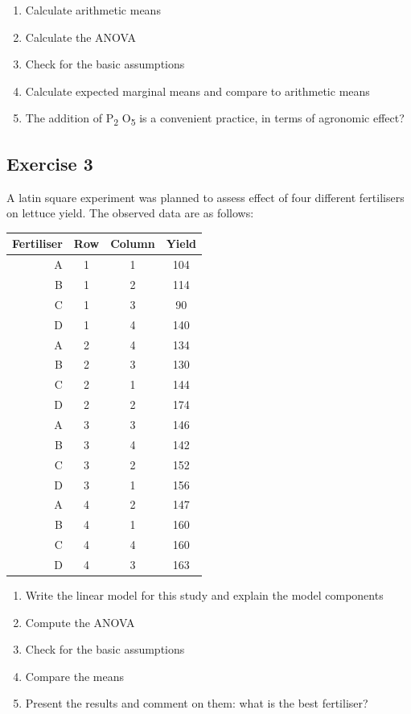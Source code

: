 \documentclass[a4paper,12pt,oneside]{book}
\providecommand{\tightlist}{%
  \setlength{\itemsep}{0pt}\setlength{\parskip}{0pt}}
\begin{document}
\begin{enumerate}
\def\labelenumi{\arabic{enumi}.}
\tightlist
\item
  Calculate arithmetic means
\item
  Calculate the ANOVA
\item
  Check for the basic assumptions
\item
  Calculate expected marginal means and compare to arithmetic means
\item
  The addition of P\textsubscript{2} O\textsubscript{5} is a convenient practice, in terms of agronomic effect?
\end{enumerate}

\hypertarget{exercise-3-4}{%
\subsection{Exercise 3}\label{exercise-3-4}}

A latin square experiment was planned to assess effect of four different fertilisers on lettuce yield. The observed data are as follows:

\begin{longtable}[]{@{}rccc@{}}
\toprule
Fertiliser & Row & Column & Yield \\
\midrule
\endhead
A & 1 & 1 & 104 \\
B & 1 & 2 & 114 \\
C & 1 & 3 & 90 \\
D & 1 & 4 & 140 \\
A & 2 & 4 & 134 \\
B & 2 & 3 & 130 \\
C & 2 & 1 & 144 \\
D & 2 & 2 & 174 \\
A & 3 & 3 & 146 \\
B & 3 & 4 & 142 \\
C & 3 & 2 & 152 \\
D & 3 & 1 & 156 \\
A & 4 & 2 & 147 \\
B & 4 & 1 & 160 \\
C & 4 & 4 & 160 \\
D & 4 & 3 & 163 \\
\bottomrule
\end{longtable}

\begin{enumerate}
\def\labelenumi{\arabic{enumi}.}
\tightlist
\item
  Write the linear model for this study and explain the model components
\item
  Compute the ANOVA
\item
  Check for the basic assumptions
\item
  Compare the means
\item
  Present the results and comment on them: what is the best fertiliser?
\end{enumerate}
\end{document}
